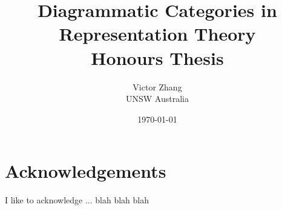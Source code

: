 \documentclass[12pt]{report}
\title{Diagrammatic Categories in Representation Theory\\
Honours Thesis\\
\red{(Draft)}}
\author{Victor Zhang\\
    UNSW Australia}
\date{\today}
\begin{document}
\maketitle

\chapter*{Acknowledgements}
\thispagestyle{empty}

I like to acknowledge ... blah blah blah


\tableofcontents
\thispagestyle{empty}
\clearpage

\setcounter{page}{1}











\printbibliography
\end{document}
